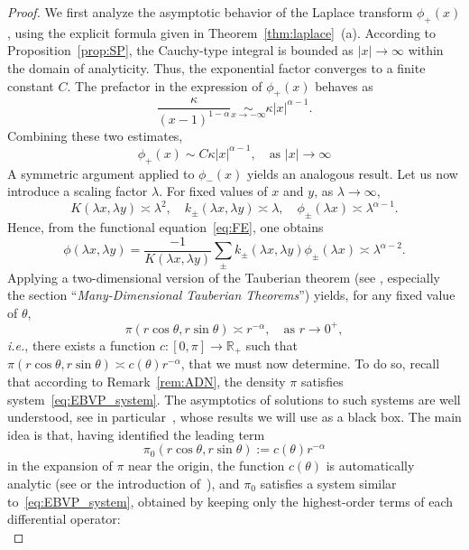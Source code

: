 \documentclass{article}
\theoremstyle{plain}
\theoremstyle{definition}
\theoremstyle{remark}
\begin{document}
\begin{proof}
    We first analyze the asymptotic behavior of the Laplace transform $\phi_+(x)$, using the explicit formula given in Theorem~\ref{thm:laplace}~(a).
According to Proposition~\ref{prop:SP}, the Cauchy-type integral is bounded as $|x| \to \infty$ within the domain of analyticity. Thus, the exponential factor converges to a finite constant $C$. The prefactor in the expression of $\phi_+(x)$ behaves as
\begin{equation*}
    \frac{\kappa}{(x-1)^{1-\alpha}} \underset{x \to -\infty}{\sim} \kappa |x|^{\alpha-1}.
\end{equation*}
Combining these two estimates,
\begin{equation*}\label{eq:phi_asymp_inf}
    \phi_+(x) \sim C\kappa|x|^{\alpha-1},\quad \text{as }|x|\to  \infty
\end{equation*}
A symmetric argument applied to $\phi_-(x)$ yields an analogous result. Let us now introduce a scaling factor $\lambda$. For fixed values of $x$ and $y$, as $\lambda \to \infty$,
$$K(\lambda x,\lambda  y)\asymp \lambda^2,\quad k_\pm(\lambda x,\lambda y)\asymp \lambda,\quad \phi_\pm(\lambda x)\asymp\lambda^{\alpha-1}.$$
Hence, from the functional equation~\eqref{eq:FE}, one obtains
$$\phi(\lambda x,\lambda y)=\frac{-1}{K(\lambda x,\lambda y)}\sum_{\pm}k_\pm(\lambda x,\lambda y)\phi_\pm(\lambda x)\asymp \lambda^{\alpha-2}.$$
Applying a two-dimensional version of the Tauberian theorem (see \cite{tauberian}, especially the section ``\textit{Many-Dimensional Tauberian Theorems}'') yields, for any fixed value of $\theta$,
$$\pi(r\cos\theta,r\sin\theta)\asymp r^{-\alpha},\quad \text{as }r\to 0^+,$$
\textit{i.e.}, there exists a function $c:[0,\pi]\to \mathbb R_+$ such that $\pi(r\cos\theta,r\sin\theta)\asymp c(\theta)r^{-\alpha}$, that we must now determine. To do so, recall that according to Remark~\ref{rem:ADN}, the density $\pi$ satisfies system~\eqref{eq:EBVP_system}. The asymptotics of solutions to such systems are well understood, see in particular~\cite{Kondratiev_1967,Costabel_Dauge_1993}, whose results we will use as a black box. The main idea is that, having identified the leading term $$\pi_0(r\cos\theta,r\sin\theta):=c(\theta)r^{-\alpha}$$ in the expansion of $\pi$ near the origin, the function $c(\theta)$ is automatically analytic (see \cite[Thm. 1.2]{Kondratiev_1967} or the introduction of~\cite{Costabel_Dauge_1993}), and $\pi_0$ satisfies a system similar to~\eqref{eq:EBVP_system}, obtained by keeping only the highest-order terms of each differential operator:
\begin{equation}\label{eq:EBVP_system_alt}

\end{equation}
\end{proof}
\end{document}
